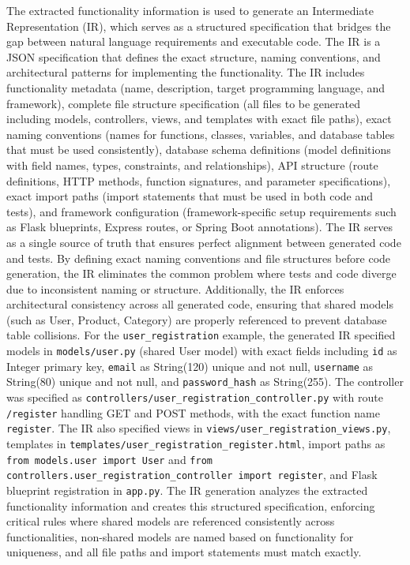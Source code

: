The extracted functionality information is used to generate an Intermediate Representation (IR), which serves as a structured specification that bridges the gap between natural language requirements and executable code. The IR is a JSON specification that defines the exact structure, naming conventions, and architectural patterns for implementing the functionality. The IR includes functionality metadata (name, description, target programming language, and framework), complete file structure specification (all files to be generated including models, controllers, views, and templates with exact file paths), exact naming conventions (names for functions, classes, variables, and database tables that must be used consistently), database schema definitions (model definitions with field names, types, constraints, and relationships), API structure (route definitions, HTTP methods, function signatures, and parameter specifications), exact import paths (import statements that must be used in both code and tests), and framework configuration (framework-specific setup requirements such as Flask blueprints, Express routes, or Spring Boot annotations). The IR serves as a single source of truth that ensures perfect alignment between generated code and tests. By defining exact naming conventions and file structures before code generation, the IR eliminates the common problem where tests and code diverge due to inconsistent naming or structure. Additionally, the IR enforces architectural consistency across all generated code, ensuring that shared models (such as User, Product, Category) are properly referenced to prevent database table collisions. For the \texttt{user\_registration} example, the generated IR specified models in \texttt{models/user.py} (shared User model) with exact fields including \texttt{id} as Integer primary key, \texttt{email} as String(120) unique and not null, \texttt{username} as String(80) unique and not null, and \texttt{password\_hash} as String(255). The controller was specified as \texttt{controllers/user\_registration\_controller.py} with route \texttt{/register} handling GET and POST methods, with the exact function name \texttt{register}. The IR also specified views in \texttt{views/user\_registration\_views.py}, templates in \texttt{templates/user\_registration\_register.html}, import paths as \texttt{from models.user import User} and \texttt{from controllers.user\_registration\_controller import register}, and Flask blueprint registration in \texttt{app.py}. The IR generation analyzes the extracted functionality information and creates this structured specification, enforcing critical rules where shared models are referenced consistently across functionalities, non-shared models are named based on functionality for uniqueness, and all file paths and import statements must match exactly.

